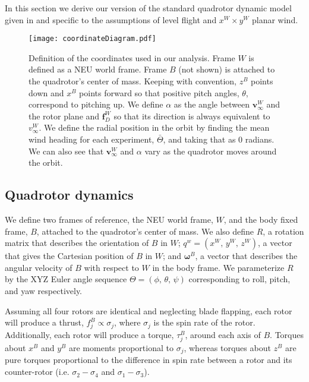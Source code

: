 
In this section we derive our version of the standard quadrotor dynamic model given in \cite{hoffmann2004stanford} and \cite{pounds2002design} specific to the assumptions of level flight and $x^W \times y^W$ planar wind. 

\begin{figure}[t]
    \label{fig:QuadDiagram}
	\centering
	\texttt{[image: coordinateDiagram.pdf]}
	\caption{Definition of the coordinates used in our analysis. Frame $W$ is defined as a NEU world frame. Frame $B$ (not shown) is attached to the quadrotor's center of mass. Keeping with convention, $z^B$ points down and $x^B$ points forward so that positive pitch angles, $\theta$, correspond to pitching up. We define $\alpha$ as the angle between $\mathbf{v}_\infty^W$ and the rotor plane and $\mathbf{f}_D^W$ so that its direction is always equivalent to $v_\infty^W$. We define the radial position in the orbit by finding the mean wind heading for each experiment, $\bar{\Theta}$, and taking that as 0 radians. We can also see that $\mathbf{v}_\infty^W$ and $\alpha$ vary as the quadrotor moves around the orbit.}
\end{figure}

\subsection{Quadrotor dynamics}
We define two frames of reference, the NEU world frame, $W$, and the body fixed frame, $B$, attached to the quadrotor's center of mass. We also define $R$, a rotation matrix that describes the orientation of $B$ in $W$; $q^{w}=\left(x^W \text{, } y^W \text{, } z^W\right)$, a vector that gives the Cartesian position of $B$ in $W$; and $\mathbf{\omega}^B$, a vector that describes the angular velocity of $B$ with respect to $W$ in the body frame. We parameterize $R$ by the XYZ Euler angle sequence $\Theta=\left(\phi \text{, } \theta \text{, } \psi\right)$ corresponding to roll, pitch, and yaw respectively.

Assuming all four rotors are identical and neglecting blade flapping, each rotor will produce a thrust, $f_j^B \propto \sigma_j$, where $\sigma_j$ is the spin rate of the rotor. Additionally, each rotor will produce a torque, $\tau_j^B$, around each axis of $B$. Torques about $x^B$ and $y^B$ are moments proportional to $\sigma_j$, whereas torques about $z^B$ are pure torques proportional to the difference in spin rate between a rotor and its counter-rotor (i.e. $\sigma_2 - \sigma_4$ and $\sigma_1 - \sigma_3$).

